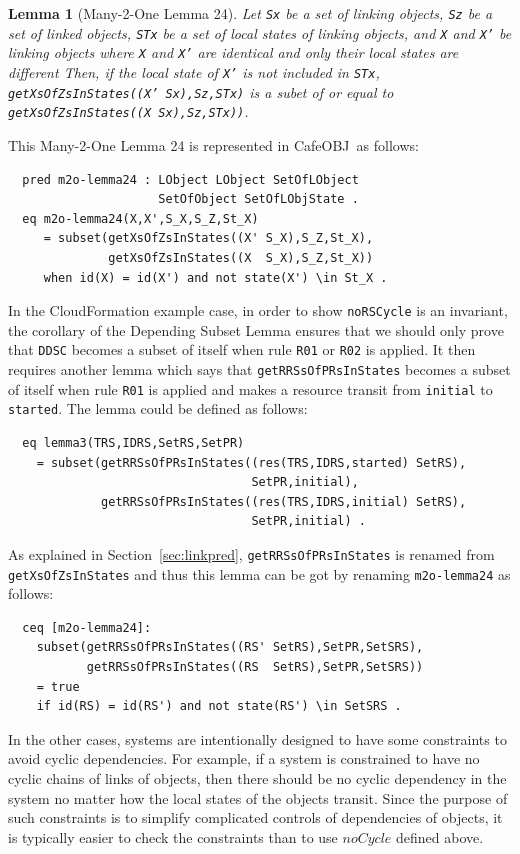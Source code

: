 \documentclass[12pt]{report}
\newtheorem{lemma}{Lemma}
\newcommand{\stt}[1]{{\small{\tt {#1}}}}
\newcommand{\cafeobj}{{\sf CafeOBJ}~}
\begin{document}
\begin{lemma}[Many-2-One Lemma 24]
  Let {\tt Sx} be a set of linking objects, {\tt Sz} be a set of
  linked objects, {\tt STx} be a set of local states of linking
  objects, and {\tt X} and {\tt X'} be linking objects where {\tt X}
  and {\tt X'} are identical and only their local states are different
  Then, if the local state of {\tt X'} is not included in {\tt STx},
  \stt{getXsOfZsInStates((X' Sx),Sz,STx)} is a subet of or equal to
  \stt{getXsOfZsInStates((X Sx),Sz,STx))}.
\end{lemma}
This Many-2-One Lemma 24 is represented in \cafeobj as follows:
\begin{verbatim}
  pred m2o-lemma24 : LObject LObject SetOfLObject
                     SetOfObject SetOfLObjState .
  eq m2o-lemma24(X,X',S_X,S_Z,St_X)
     = subset(getXsOfZsInStates((X' S_X),S_Z,St_X),
              getXsOfZsInStates((X  S_X),S_Z,St_X))
     when id(X) = id(X') and not state(X') \in St_X .
\end{verbatim}
In the CloudFormation example case, in order to show {\tt noRSCycle}
is an invariant, the corollary of the Depending Subset Lemma ensures
that we should only prove that {\tt DDSC} becomes a subset of itself
when rule {\tt R01} or {\tt R02} is applied. It then requires another
lemma which says that {\tt getRRSsOfPRsInStates} becomes a subset of
itself when rule {\tt R01} is applied and makes a resource transit
from {\tt initial} to {\tt started}.  The lemma could be defined as
follows:
\begin{verbatim}
  eq lemma3(TRS,IDRS,SetRS,SetPR)
    = subset(getRRSsOfPRsInStates((res(TRS,IDRS,started) SetRS),
                                  SetPR,initial), 
             getRRSsOfPRsInStates((res(TRS,IDRS,initial) SetRS),
                                  SetPR,initial) .
\end{verbatim}
As explained in Section~\ref{sec:linkpred}, {\tt getRRSsOfPRsInStates}
is renamed from {\tt getXsOfZsInStates} and thus this lemma can be got
by renaming {\tt m2o-lemma24} as follows:
\begin{verbatim}
  ceq [m2o-lemma24]:
    subset(getRRSsOfPRsInStates((RS' SetRS),SetPR,SetSRS),
           getRRSsOfPRsInStates((RS  SetRS),SetPR,SetSRS))
    = true
    if id(RS) = id(RS') and not state(RS') \in SetSRS .
\end{verbatim}

In the other cases, systems are intentionally designed to have some constraints
to avoid cyclic dependencies. For example, if a system is constrained to
have no cyclic chains of links of objects, then there should be no
cyclic dependency in the system no matter how the local states of the
objects transit. Since the purpose of such constraints is to simplify
complicated controls of dependencies of objects, it is typically easier
to check the constraints than to use $noCycle$ defined above.
\end{document}

